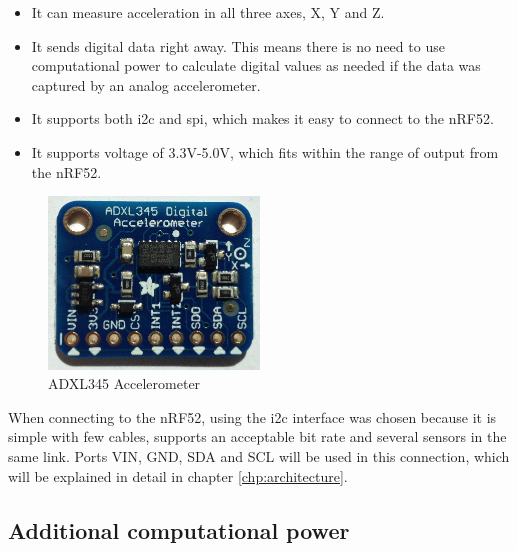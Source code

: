 \begin{itemize}
  \item It can measure acceleration in all three axes, X, Y and Z.
  \item It sends digital data right away. This means there is no need to use computational power to calculate digital values as needed if the data was captured by an analog accelerometer. 
  \item It supports both \gls{i2c} and \gls{spi}, which makes it easy to connect to the nRF52. 
  \item It supports voltage of 3.3V-5.0V, which fits within the range of output from the nRF52.  
\end{itemize}




\begin{figure}[ht]
    \centering
    \includegraphics[width=0.5\textwidth]{adxl345imagge}    
    \caption{ADXL345 Accelerometer}
    \label{fig:adxl345}
\end{figure}

When connecting to the \gls{nRF52}, using the \gls{i2c} interface was chosen because it is simple with few cables, supports an acceptable bit rate and several sensors in the same link. Ports VIN, GND, SDA and SCL will be used in this connection, which will be explained in detail in chapter \ref{chp:architecture}. 

\subsection{Additional computational power}

